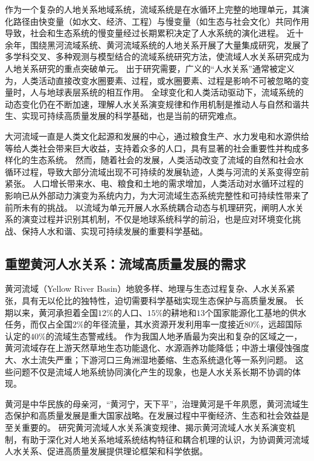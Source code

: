 作为一个复杂的人地关系地域系统，流域系统是在水循环上完整的地理单元，其演化路径由快变量（如水文、经济、工程）与慢变量（如生态与社会文化）共同作用导致，社会和生态系统的慢变量经过长期累积决定了人水系统的演化进程\cite{falkenmark2021}。
近十余年，围绕黑河流域系统、黄河流域系统的人地关系开展了大量集成研究，发展了多学科交叉、多种观测与模型结合的流域系统研究方法，使流域人\textendash{}水关系研究成为人地关系研究的重点突破单元\cite{cheng2014, fu2021a}。
出于研究需要，广义的“人\textendash{}水关系”通常被定义为，人类活动直接改变水圈要素、过程，或水圈要素、过程是影响不可被忽略的变量时，人与地球表层系统的相互作用。
全球变化和人类活动驱动下，流域系统的动态变化仍在不断加速，理解人\textendash{}水关系演变规律和作用机制是推动人与自然和谐共生、实现可持续高质量发展的科学基础，也是当前的研究难点\cite{reyers2018}。

大河流域一直是人类文化起源和发展的中心，通过粮食生产、水力发电和水源供给等给人类社会带来巨大收益，支持着众多的人口，具有显著的社会重要性并构成多样化的生态系统\cite{best2019}。
然而，随着社会的发展，人类活动改变了流域的自然和社会水循环过程，导致大部分流域出现不可持续的发展轨迹，人类与河流的关系变得空前紧张\cite{best2019, best2020}。
人口增长带来水、电、粮食和土地的需求增加，人类活动对水循环过程的影响已从外部动力演变为系统内力，为大河流域生态系统完整性和可持续性带来了前所未有的挑战\cite{crutzen2006, dibaldassarre2019}。
以流域为单元开展人水系统耦合动态与机理研究，阐明人\textendash{}水关系的演变过程并识别其机制，不仅是地球系统科学的前沿，也是应对环境变化挑战、保持人水和谐、实现可持续发展的重要科学基础。

\subsection{重塑黄河人\textendash{}水关系：流域高质量发展的需求}

黄河流域（Yellow River Basin）地貌多样、地理与生态过程复杂、人\textendash{}水关系紧张，具有无以伦比的独特性，迫切需要科学基础实现生态保护与高质量发展。
长期以来，黄河承担着全国$12\%$的人口、$15\%$的耕地和$13$个国家能源化工基地的供水任务，而仅占全国$2\%$的年径流量，其水资源开发利用率一度接近$80\%$，远超国际认定的$40\%$的流域生态警戒线\cite{fu2021a}。
作为我国人地矛盾最为突出和复杂的区域之一，黄河流域存在上游天然草地生态功能退化、水源涵养功能降低；中游土壤侵蚀强度大、水土流失严重；下游河口三角洲湿地萎缩、生态系统退化等一系列问题\cite{mazhuguo2020}。
这些问题不仅是流域人地系统协同演化产生的现象，也是人\textendash{}水关系长期不协调的体现\cite{fu2021a}。

黄河是中华民族的母亲河，“黄河宁，天下平”，治理黄河是千年夙愿，黄河流域生态保护和高质量发展是重大国家战略。在发展过程中平衡经济、生态和社会效益是至关重要的。
研究黄河流域人\textendash{}水关系演变规律、揭示黄河流域人\textendash{}水关系演变机制，有助于深化对人地关系地域系统结构特征和耦合机理的认识，为协调黄河流域人\textendash{}水关系、促进高质量发展提供理论框架和科学依据。
